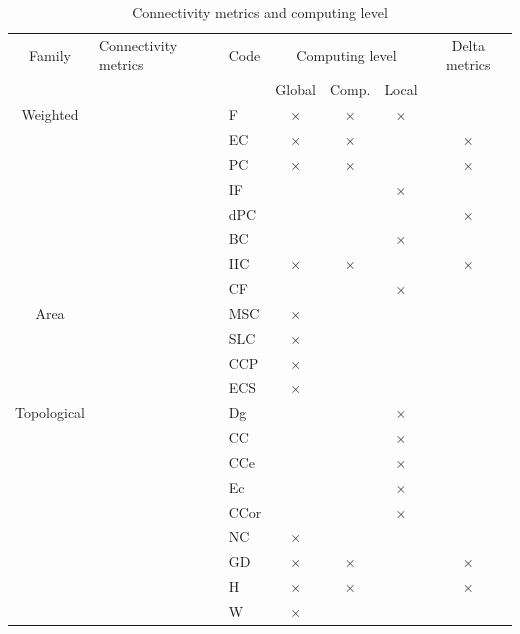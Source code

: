 \documentclass{article}
\begin{document}
\begin{table}[H]
	\begin{tabular}{|c|l|l|c|c|c|c|}
		\hline
		Family & Connectivity metrics & Code & \multicolumn{3}{m{3.6cm}|}{\centering Computing level} & Delta metrics\\
		\hhline{~~~---~}
		& & & Global & Comp. & Local &\\
		\hline
		Weighted
		& \nameref{metric_F} & F & × & × & × &\\
		\hhline{~------}
		& \nameref{metric_EC} & EC & × & × &  & ×\\
		\hhline{~------}
		& \nameref{metric_PC} & PC & × & × &  & ×\\
		\hhline{~------}
		& \nameref{metric_IF}  & IF &  &  & × &\\
		\hhline{~------}
		& \nameref{metric_dPC} & dPC &  &  &  & ×\\
		\hhline{~------} 
		& \nameref{metric_BC} & BC &  &  & × & \\
		\hhline{~------}
		& \nameref{metric_IIC} & IIC & × & × &  & × \\
		\hhline{~------}	
		& \nameref{metric_CF} & CF &  &  & × & \\
		\hline
		Area
		& \nameref{metric_MSC} & MSC & × &  &  & \\
		\hhline{~------}
		& \nameref{metric_SLC} & SLC & × &  &  & \\
		\hhline{~------}
		& \nameref{metric_CCP} & CCP & × &  &  & \\
		\hhline{~------}
		& \nameref{metric_ECS} & ECS & × &  &  & \\
		\hline
		Topological 
		& \nameref{metric_Dg} & Dg &  &  & × & \\
		\hhline{~------}
		& \nameref{metric_CC}  & CC &  &  & × & \\
		\hhline{~------}
		& \nameref{metric_CCe} & CCe &  &  & × & \\
		\hhline{~------}
		& \nameref{metric_Ec} & Ec &  &  & × & \\
		\hhline{~------}
		& \nameref{metric_CCor} & CCor &  &  & × & \\
		\hhline{~------}
		& \nameref{metric_NC} & NC & × &  &  & \\
		\hhline{~------}
		& \nameref{metric_GD} & GD & × & × &  & ×\\
		\hhline{~------}
		& \nameref{metric_H} & H & × & × &  & ×\\
		\hhline{~------}
		& \nameref{metric_W} & W & × &  &  & \\
		\hline
	\end{tabular}
	\caption{Connectivity metrics and computing level}
	\label{metric_level}
\end{table}
\end{document}
